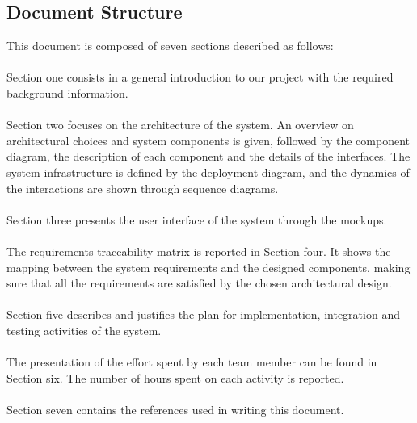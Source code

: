 \documentclass[../main.tex]{subfiles}
\begin{document}
\subsection{Document Structure}
This document is composed of seven sections described as follows:
\\
\\
Section one consists in a general introduction to our project with the required background information.
\\
\\
Section two focuses on the architecture of the system. An overview on architectural choices and system components is given, followed by the component diagram, the description of each component and the details of the interfaces. The system infrastructure is defined by the deployment diagram, and the dynamics of the interactions are shown through sequence diagrams.
\\
\\
Section three presents the user interface of the system through the mockups. 
\\
\\
The requirements traceability matrix is reported in Section four. It shows the mapping between the system requirements and the designed components, making sure that all the requirements are satisfied by the chosen architectural design. 
\\
\\
Section five describes and justifies the plan for implementation, integration and testing activities of the system. 
\\
\\
The presentation of the effort spent by each team member can be found in Section six. The number of hours spent on each activity is reported.
\\
\\
Section seven contains the references used in writing this document.
\end{document}
